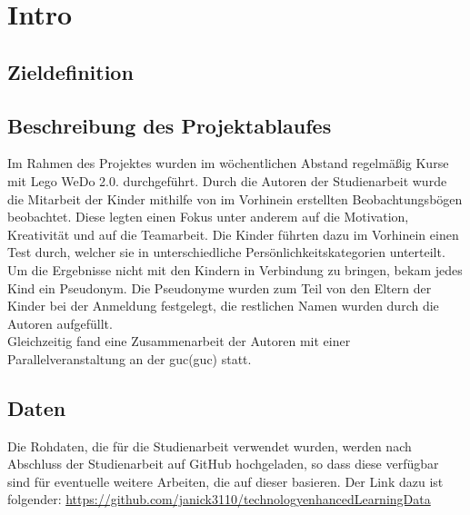 \chapter{Intro}


\section{Zieldefinition}
\cite{SevenHCIGrandChallenges}




\section{Beschreibung des Projektablaufes}
Im Rahmen des Projektes wurden im wöchentlichen Abstand regelmäßig Kurse mit Lego WeDo 2.0. durchgeführt. Durch die Autoren der Studienarbeit wurde die Mitarbeit der Kinder mithilfe von im Vorhinein erstellten Beobachtungsbögen beobachtet. Diese legten einen Fokus unter anderem auf die Motivation, Kreativität und auf die Teamarbeit. Die Kinder führten dazu im Vorhinein einen Test durch, welcher sie in unterschiedliche Persönlichkeitskategorien unterteilt. Um die Ergebnisse nicht mit den Kindern in Verbindung zu bringen, bekam jedes Kind ein Pseudonym. Die Pseudonyme wurden zum Teil von den Eltern der Kinder bei der Anmeldung festgelegt, die restlichen Namen wurden durch die Autoren aufgefüllt.\\
Gleichzeitig fand eine Zusammenarbeit der Autoren mit einer Parallelveranstaltung an der \acrlong{guc}(\acrshort{guc}) statt.\\


\section{Daten}
Die Rohdaten, die für die Studienarbeit verwendet wurden, werden nach Abschluss der Studienarbeit auf GitHub hochgeladen, so dass diese verfügbar sind für eventuelle weitere Arbeiten, die auf dieser basieren. Der Link dazu ist folgender: \url{https://github.com/janick3110/technologyenhancedLearningData}